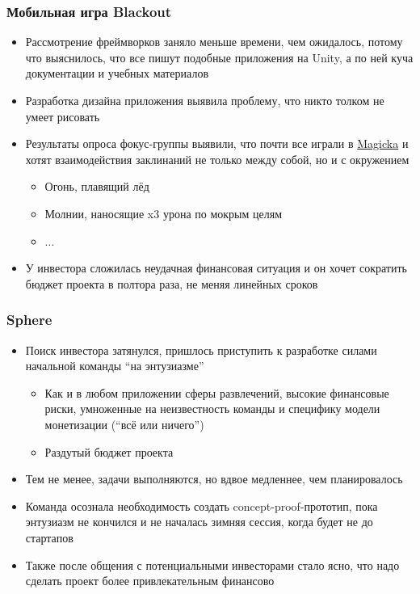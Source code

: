 \documentclass[xetex,mathserif,serif]{beamer}
\begin{document}
	\begin{frame}
		\frametitle{Мобильная игра Blackout}
		\begin{itemize}
			\item Рассмотрение фреймворков заняло меньше времени, чем ожидалось, потому что выяснилось, что все пишут подобные приложения на Unity, а по ней куча документации и учебных материалов
			\item Разработка дизайна приложения выявила проблему, что никто толком не умеет рисовать
			\item Результаты опроса фокус-группы выявили, что почти все играли в \href{http://store.steampowered.com/app/42910/Magicka/}{Magicka} и хотят взаимодействия заклинаний не только между собой, но и с окружением
			\begin{itemize}
				\item Огонь, плавящий лёд
				\item Молнии, наносящие x3 урона по мокрым целям
				\item ...
			\end{itemize}
			\item У инвестора сложилась неудачная финансовая ситуация и он хочет сократить бюджет проекта в полтора раза, не меняя линейных сроков
		\end{itemize}
	\end{frame}

	\begin{frame}
		\frametitle{Sphere}
		\begin{itemize}
			\item Поиск инвестора затянулся, пришлось приступить к разработке силами начальной команды ``на энтузиазме''
			\begin{itemize}
				\item Как и в любом приложении сферы развлечений, высокие финансовые риски, умноженные на неизвестность команды и специфику модели монетизации (``всё или ничего'')
				\item Раздутый бюджет проекта
			\end{itemize}
			\item Тем не менее, задачи выполняются, но вдвое медленнее, чем планировалось
			\item Команда осознала необходимость создать concept-proof-прототип, пока энтузиазм не кончился и не началась зимняя сессия, когда будет не до стартапов
			\item Также после общения с потенциальными инвесторами стало ясно, что надо сделать проект более привлекательным финансово
		\end{itemize}
	\end{frame}
\end{document}
